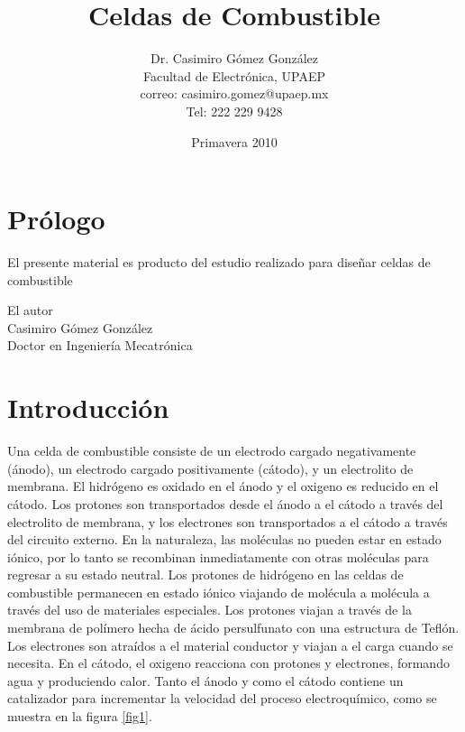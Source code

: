 \documentclass[12pt]{book}
\title{Celdas de Combustible}
\author{Dr. Casimiro Gómez González\\
	Facultad de Electrónica, UPAEP\\
               correo: casimiro.gomez@upaep.mx\\
               Tel: 222 229 9428}
\date{Primavera 2010}
\theoremstyle{definition}
\theoremstyle{remark}
\theoremstyle{plain}
\begin{document}
\frontmatter
\maketitle


\chapter{Prólogo}

El presente material es producto del estudio realizado para diseñar celdas de combustible

\begin{flushright}

El autor\\
Casimiro Gómez González\\
Doctor en Ingeniería Mecatrónica
\end{flushright}

\tableofcontents

\mainmatter
\chapter{Introducción}
Una celda de combustible consiste de un electrodo cargado negativamente (ánodo), un electrodo cargado positivamente (cátodo), y un electrolito de membrana. El hidrógeno es oxidado en el ánodo y el oxigeno es reducido en el cátodo. 
Los protones son transportados desde el ánodo a el cátodo a través del electrolito de membrana, y los electrones son transportados a el cátodo  a través del circuito externo. 
En la naturaleza, las moléculas no pueden estar en estado iónico, por lo tanto se recombinan inmediatamente con otras moléculas para regresar a su estado neutral. 
Los protones de hidrógeno en las celdas de combustible permanecen en estado iónico viajando de molécula a molécula a través del uso de materiales especiales. Los protones 
viajan a través de la membrana de polímero hecha de ácido persulfunato con una estructura de Teflón.  Los electrones son atraídos a el material conductor y viajan a el carga 
cuando se necesita. En el cátodo, el oxigeno reacciona con protones y electrones, formando agua y produciendo calor. Tanto  el ánodo y como el cátodo contiene un catalizador
 para incrementar la velocidad del proceso electroquímico, como se muestra en la figura \ref{fig1}.
\end{document}
